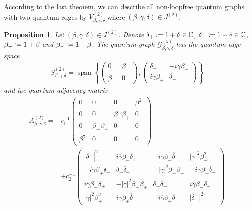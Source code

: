 \documentclass{amsart}
\newtheorem{proposition}[thm]{Proposition}
\newcommand{\C}{\mathbb{C}}
\DeclareMathOperator{\spann}{span}
\begin{document}
According to the last theorem, we can describe all non-loopfree quantum graphs with two quantum edges by $V_{\beta,\gamma,\delta}^{(2)}$ where $(\beta,\gamma,\delta)\in J^{(2)}$.




\begin{proposition}
\label{t2e::prop:properties_of_G_alpha,beta,delta^(2)}
    Let $(\beta,\gamma,\delta)\in J^{(2)}$.
    Denote $\delta_+\vcentcolon=1+\delta\in\C$, $\delta_-\vcentcolon=1-\delta\in\C$, $\beta_+\vcentcolon=1+\beta$ and $\beta_-\vcentcolon=1-\beta$.
    The quantum graph $\mathcal{G}_{\beta,\gamma,\delta}^{(2)}$ has the quantum edge space
    \begin{align*}
        S_{\beta,\gamma,\delta}^{(2)}=\spann\left\{
            \begin{pmatrix}
                0&\beta_+\\
                \beta_-&0
            \end{pmatrix},
            \begin{pmatrix}
                \delta_+&-i\gamma\beta_-\\
                i\gamma\beta_+&\delta_-
            \end{pmatrix}
            \right\}
    \end{align*}
    and the quantum adjacency matrix
    \begin{align*}
        A_{\beta,\gamma,\delta}^{(2)}=
        &c_1^{-1}
        \begin{pmatrix}
            0&0&0&\beta_+^2\\
            0&0&\beta_-\beta_+&0\\
            0&\beta_-\beta_+&0&0\\
            \beta_-^2&0&0&0
        \end{pmatrix}\\
        &+
        c_2^{-1}
            \begin{pmatrix}
                |\delta_+|^2&i\overline{\gamma}\beta_-\delta_+&-i\gamma\beta_-\overline{\delta}_+&|\gamma|^2\beta_-^2\\
                -i\overline{\gamma}\beta_+\delta_+&\delta_+\overline{\delta}_-&-|\gamma|^2\beta_-\beta_+&-i\gamma\beta_-\overline{\delta}_-\\
                i\gamma\beta_+\overline{\delta}_+&-|\gamma|^2\beta_-\beta_+&\overline{\delta}_+\delta_-&i\overline{\gamma}\beta_-\delta_-\\
                |\gamma|^2\beta_+^2&i\gamma\beta_+\overline{\delta}_-&-i\overline{\gamma}\beta_+\delta_-&|\delta_-|^2

\end{pmatrix}
\end{align*}
\end{proposition}
\end{document}

